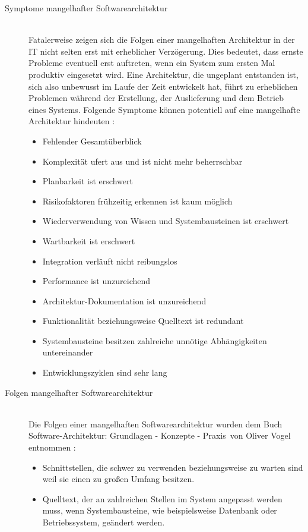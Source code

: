 \begin{description}
\item[Symptome mangelhafter Softwarearchitektur] \hfill \\
  Fatalerweise zeigen sich die Folgen einer mangelhaften Architektur in der IT nicht selten erst mit erheblicher Verzögerung. Dies bedeutet, dass ernste Probleme eventuell erst auftreten, wenn ein System zum ersten Mal produktiv eingesetzt wird. Eine Architektur, die ungeplant entstanden ist, sich also unbewusst im Laufe der Zeit entwickelt hat, führt zu erheblichen Problemen während der Erstellung, der Auslieferung und dem Betrieb eines Systems. Folgende Symptome können potentiell auf eine mangelhafte Architektur hindeuten \citereset \autocite[siehe][S. 6-8]{Vogel.2009}:
  \begin{itemize}
  \item Fehlender Gesamtüberblick
  \item Komplexität ufert aus und ist nicht mehr beherrschbar
  \item Planbarkeit ist erschwert
  \item Risikofaktoren frühzeitig erkennen ist kaum möglich
  \item Wiederverwendung von Wissen und Systembausteinen ist erschwert
  \item Wartbarkeit ist erschwert
  \item Integration verläuft nicht reibungslos
  \item Performance ist unzureichend
  \item Architektur-Dokumentation ist unzureichend
  \item Funktionalität beziehungsweise Quelltext ist redundant
  \item Systembausteine besitzen zahlreiche unnötige Abhängigkeiten untereinander
  \item Entwicklungszyklen sind sehr lang
  \end{itemize}
\item[Folgen mangelhafter Softwarearchitektur] \hfill \\
  Die Folgen einer mangelhaften Softwarearchitektur wurden dem Buch \glqq Software-Architektur: Grundlagen - Konzepte - Praxis\grqq\ von Oliver Vogel entnommen \citereset \autocite[siehe][6-8]{Vogel.2009}:
  \begin{itemize}
  \item Schnittstellen, die schwer zu verwenden beziehungsweise zu warten sind weil sie einen zu großen Umfang besitzen.
  \item Quelltext, der an zahlreichen Stellen im System angepasst werden muss, wenn Systembausteine, wie beispielsweise Datenbank oder Betriebssystem, geändert werden.

\end{itemize}
\end{description}

